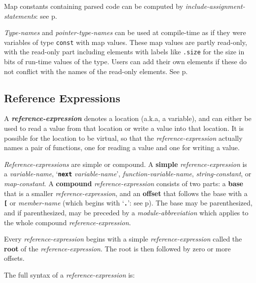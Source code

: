 \documentclass[12pt]{article}
\newcommand{\TT}[1]{{\tt \bfseries #1}}
\newcommand{\key}[1]{{\rm \bfseries #1}}
\newcommand{\emkey}[1]{{\em \bfseries #1}}
\newcommand{\pagref}[1]{p\pageref{#1}}
\begin{document}
Map constants containing parsed code can be computed
by {\em include-assignment-statements}:
see \pagref{INCLUDE-ASSIGNMENT-STATEMENT}.

{\em Type-names} and {\em pointer-type-names} can be used at
compile-time as if they were variables of type {\tt const}
with map values.  These map values are partly read-only,
with the read-only part including elements with labels like
{\tt .size} for the size in bits of run-time values of the type.
Users can add their own elements if these do not conflict
with the names of the read-only elements.  See \pagref{TYPE-MAPS}.

\subsection{Reference Expressions}
\label{REFERENCE-EXPRESSIONS}

A \emkey{reference-expression} denotes a location (a.k.a, a variable),
and can either be used
to read a value from that location or write a value into that location.
It is possible for the location to be virtual, so that the
{\em reference-expression}
actually names a pair of functions, one for reading a value and one for
writing a value.

{\em Reference-expressions} are simple or compound.
A \key{simple} {\em reference-expression} is
a {\em variable-name}, `\TT{next} {\em variable-name}',
{\em function-variable-name}, {\em string-constant}, or {\em map-constant}.
A \key{compound} {\em reference-expression} consists of two parts:
a \key{base} that is a smaller {\em reference-expression},
and an \key{offset} that follows the base with
a \TT{[} or {\em member-name}
(which begins with `\TT{.}': see \pagref{MEMBER-NAME}).
The base may be parenthesized, and
if parenthesized, may be preceded by a {\em module-abbreviation} which
applies to the whole compound {\em reference-expression}.

Every {\em reference-expression} begins with a simple
{\em reference-expression} called the \key{root} of the
{\em reference-expression}.  The root is then followed by zero or more
offsets.

The full syntax of a {\em reference-expression} is:
\end{document}

